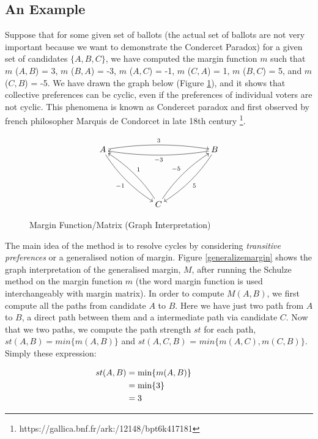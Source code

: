 	\subsection{An Example}
	Suppose that for some given set of ballots (the actual set of ballots are not very important because we want to demonstrate the Condercet Paradox) for 
	a given set of candidates $\lbrace A, B, C \rbrace$, 
	we have computed 
	the margin function $m$ such that $m$ ($A, B$) = 3, $m$ ($B, A$) = -3, $m$ ($A, C$) = -1, 
	$m$ ($C, A$) = 1, $m$ ($B, C$) = 5, and $m$ ($C, B$) = -5. We have drawn the graph below (Figure \ref{marginfn}), and 
	it shows that collective preferences can be cyclic, even if the preferences of individual voters are not cyclic. This phenomena 
	is known as Condercet paradox and first observed by french philosopher Marquis de Condorcet in late 18th century \footnote{https://gallica.bnf.fr/ark:/12148/bpt6k417181}.
	   
	   

 \begin{figure}[h]
\[
\xymatrix@R=12ex@C=12ex{
A \ar@/^/[rr]^{3} \ar@/_/[dr]_{-1} & & B \ar@/^/[ll]^{-3}
\ar@/^/[dl]^5 \\
& C \ar@/_/[ul]_{1} \ar@/^/[ur]^{-5}
}\]

\caption{Margin Function/Matrix (Graph Interpretation)}\label{marginfn}
\end{figure}  


The main idea of the method is to resolve cycles by considering \emph{transitive preferences} or a generalised notion of margin. 
Figure \ref{generalizemargin} shows the graph interpretation of the generalised 
margin, $M$, after running the Schulze method on the margin function $m$ (the 
word margin function is used interchangeably with margin matrix).  In order to 
compute $M(A, B)$, we first compute all the paths from candidate $A$ to $B$. Here we have just two path from $A$ to $B$, a direct path between them and 
a intermediate path via candidate $C$.  Now that we two paths, we compute the path strength $st$ for each path, $st(A, B) = min \lbrace m (A, B) \rbrace $ 
and $st (A, C, B)$ = $min \lbrace m (A, C), m (C, B) \rbrace$.  Simply these expression:

\begin{align}
\hspace{-3cm} st (A, B)&=  \min \lbrace m (A, B) \rbrace  \nonumber \\
					  &= \min \lbrace 3 \rbrace \nonumber \\
                     &= 3 \nonumber
\end{align}


